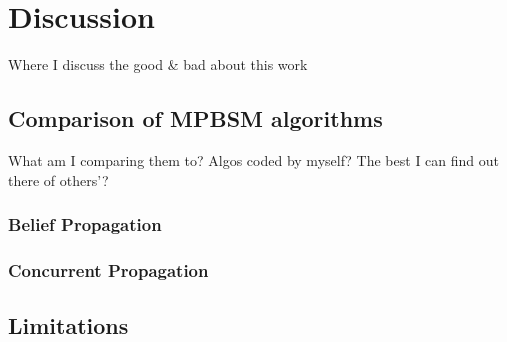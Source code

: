\chapter{Discussion}

Where I discuss the good \& bad about this work

\section{Comparison of MPBSM algorithms}

What am I comparing them to?  Algos coded by myself?  The best I can find out there of others'?

\subsection{Belief Propagation}

\subsection{Concurrent Propagation}

\section{Limitations}
